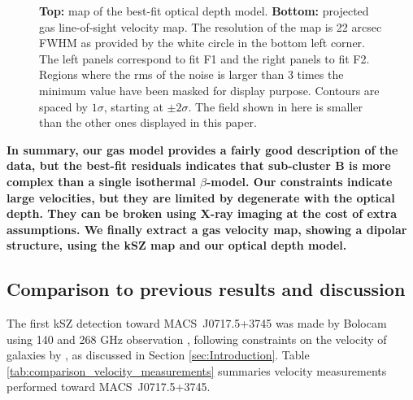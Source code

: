 \documentclass[twocolumn,traditabstract]{aa}
\begin{document}
\begin{figure}[h]
\caption{\footnotesize{{\bf Top:} map of the best-fit optical depth model. {\bf Bottom:} projected gas line-of-sight velocity map. The resolution of the map is 22 arcsec FWHM as provided by the white circle in the bottom left corner. The left panels correspond to fit F1 and the right panels to fit F2. Regions where the rms of the noise is larger than 3 times the minimum value have been masked for display purpose. Contours are spaced by $1 \sigma$, starting at $\pm 2 \sigma$. The field shown in here is smaller than the other ones displayed in this paper.}}
\label{fig:velocity_tau_map}
\end{figure}

{\bf In summary, our gas model provides a fairly good description of the data, but the best-fit residuals indicates that sub-cluster B is more complex than a single isothermal $\beta$-model. Our constraints indicate large velocities, but they are limited by degenerate with the optical depth. They can be broken using X-ray imaging at the cost of extra assumptions. We finally extract a gas velocity map, showing a dipolar structure, using the kSZ map and our optical depth model.}

\subsection{Comparison to previous results and discussion}
The first kSZ detection toward \mbox{MACS~J0717.5+3745} was made by Bolocam using 140 and 268 GHz observation \citep{Sayers2013}, following constraints on the velocity of galaxies by \cite{Ma2009}, as discussed in Section \ref{sec:Introduction}. Table \ref{tab:comparison_velocity_measurements} summaries velocity measurements performed toward \mbox{MACS~J0717.5+3745}.
\end{document}
